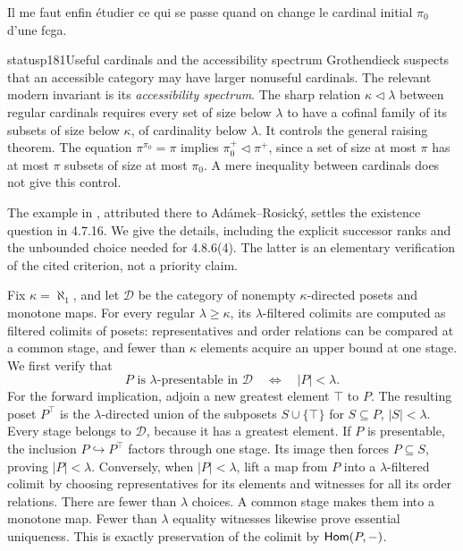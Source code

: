 \noindent{}Il me faut enfin étudier ce qui se passe quand on change le cardinal initial $\pi_0$ d'une fcga.

\begin{dcomment}{status}{p181}{Useful cardinals and the accessibility spectrum}
Grothendieck suspects that an accessible category may have larger nonuseful cardinals. The relevant modern invariant is its \emph{accessibility spectrum}. The sharp relation $\kappa\mathrel{\triangleleft}\lambda$ between regular cardinals requires every set of size below $\lambda$ to have a cofinal family of its subsets of size below $\kappa$, of cardinality below $\lambda$. It controls the general raising theorem. The equation $\pi^{\pi_0}=\pi$ implies $\pi_0^+\mathrel{\triangleleft}\pi^+$, since a set of size at most $\pi$ has at most $\pi$ subsets of size at most $\pi_0$. A mere inequality between cardinals does not give this control.

The example in \citet[Remark 3.7 and Example 3.8]{Vasey2020Accessible}, attributed there to Ad\'amek--Rosick\'y, settles the existence question in 4.7.16. We give the details, including the explicit successor ranks and the unbounded choice needed for 4.8.6(4). The latter is an elementary verification of the cited criterion, not a priority claim.

Fix $\kappa=\aleph_1$, and let $\mathcal D$ be the category of nonempty $\kappa$-directed posets and monotone maps. For every regular $\lambda\geq\kappa$, its $\lambda$-filtered colimits are computed as filtered colimits of posets: representatives and order relations can be compared at a common stage, and fewer than $\kappa$ elements acquire an upper bound at one stage. We first verify that
\[
 P\text{ is }\lambda\text{-presentable in }\mathcal D
 \quad\Longleftrightarrow\quad |P|<\lambda.
\]
For the forward implication, adjoin a new greatest element $\top$ to $P$. The resulting poset $P^\top$ is the $\lambda$-directed union of the subposets $S\cup\{\top\}$ for $S\subseteq P$, $|S|<\lambda$. Every stage belongs to $\mathcal D$, because it has a greatest element. If $P$ is presentable, the inclusion $P\hookrightarrow P^\top$ factors through one stage. Its image then forces $P\subseteq S$, proving $|P|<\lambda$. Conversely, when $|P|<\lambda$, lift a map from $P$ into a $\lambda$-filtered colimit by choosing representatives for its elements and witnesses for all its order relations. There are fewer than $\lambda$ choices. A common stage makes them into a monotone map. Fewer than $\lambda$ equality witnesses likewise prove essential uniqueness. This is exactly preservation of the colimit by $\mathsf{Hom}(P,-)$.


\end{dcomment}
